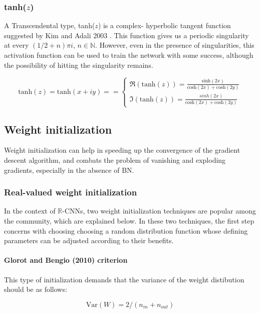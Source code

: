 


\subsubsection{tanh($z$)}
A Transcendental type, tanh($z$) is a complex- hyperbolic tangent function suggested by Kim and Adali 2003 \cite{kim2003approximation}.
This function gives us a periodic singularity at every
$(1/2 + n)\pi i$, $n \in \mathbb{N}$. However, even in the presence of singularities, this activation function can be used to train the network with some success, although the possibility of hitting the singularity remains.

\begin{equation}
\mathrm{tanh}(z) = \mathrm{tanh}(x+iy) = 
{}=\begin{cases} \Re(\mathrm{tanh}(z)) = \frac{\mathrm{sinh}(2x)}{\mathrm{cosh}(2x)+\mathrm{cosh}(2y)} \\ \Im(\mathrm{tanh}(z)) = \frac{sinh(2x)}{\mathrm{cosh}(2x)+\mathrm{cosh}(2y)} \end{cases}
\end{equation}


 \subsection{Weight initialization}
 Weight initialization can help in speeding up the convergence of the gradient descent algorithm, and combats the problem of vanishing and exploding gradients, especially in the absence of BN. 
 
 
 \subsubsection{Real-valued weight initialization}\label{rvwi}
 In the context of $\mathbb{R}$-CNNs, two weight initialization techniques are popular among the community, which are explained below. In these two techniques, the first step concerns with choosing choosing a random distribution function whose defining parameters can be adjusted according to their benefits.
 \paragraph{Glorot and Bengio (2010) criterion}
 This type of initialization demands that the variance of the weight distibution should be as follows:

  \begin{equation}\label{gbwi}
\mathrm{Var}(W) = 2/(n_{in}+n_{out})
\end{equation}
 
